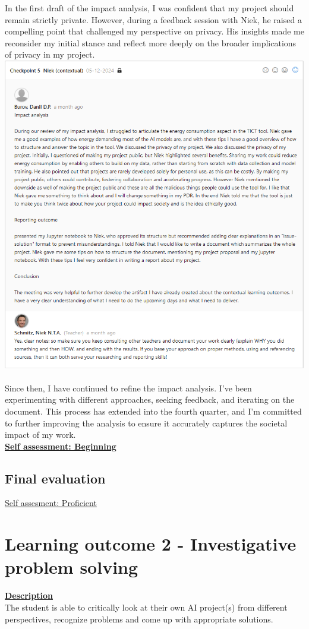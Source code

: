 \documentclass{article}
\begin{document}
	In the first draft of the impact analysis, I was confident that my project should remain strictly private. However, during a feedback session with Niek, he raised a compelling point that challenged my perspective on privacy. His insights made me reconsider my initial stance and reflect more deeply on the broader implications of privacy in my project.\\
  \includegraphics[width=\textwidth]{images/Feedback_Niek_2.png}\\\\
	Since then, I have continued to refine the impact analysis. I’ve been experimenting with different approaches, seeking feedback, and iterating on the document. This process has extended into the fourth quarter, and I’m committed to further improving the analysis to ensure it accurately captures the societal impact of my work.\\
	  \underline{\textbf{Self assessment: Beginning}}
	\subsection{Final evaluation} %
	\underline{Self assesment: Proficient}
	
	\section{Learning outcome 2 - Investigative problem solving}
	\underline{\textbf{Description}}\\
	The student is able to critically look at their own AI project(s) from different perspectives, 
	recognize problems and come up with appropriate solutions.
	
\end{document}
